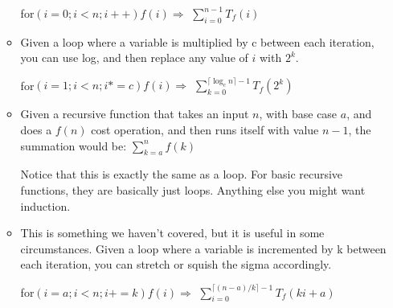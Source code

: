 \documentclass{article}
\begin{document}
\begin{itemize}
\begin{itemize}
                for$(i = 0; i < n; i++) f(i) \Rightarrow$
                $\sum_{i=0}^{n-1} T_f(i)$
            \item
                Given a loop where a variable is multiplied by c between each iteration, you can use log, and then replace any value of $i$ with $2^k$.

                for$(i = 1; i < n; i *= c) f(i) \Rightarrow$
                $\sum_{k=0}^{\lceil \log_c n \rceil - 1} T_f(2^k)$
            \item
                Given a recursive function that takes an input $n$, with base case $a$, and does a $f(n)$ cost operation, and then runs itself with value $n-1$, the summation would be:
                $\sum_{k=a}^{n} f(k)$

                Notice that this is exactly the same as a loop. For basic recursive functions, they are basically just loops. Anything else you might want induction.
            \item
                This is something we haven't covered, but it is useful in some circumstances.
                Given a loop where a variable is incremented by k between each iteration, you can stretch or squish the sigma accordingly.

                for$(i = a; i < n; i += k) f(i) \Rightarrow$
                $\sum_{i=0}^{\lceil(n-a)/k \rceil - 1} T_f(ki + a)$
        \end{itemize}
\end{itemize}
\end{document}
